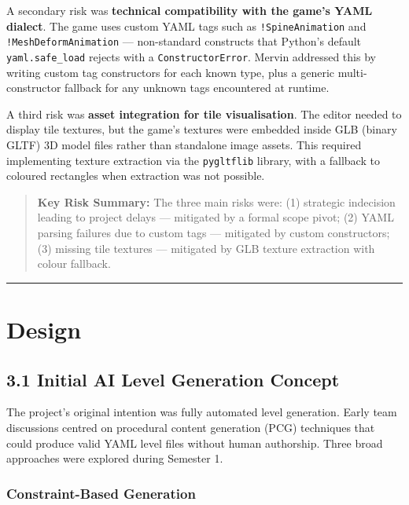 A secondary risk was \textbf{technical compatibility with the game's
YAML dialect}. The game uses custom YAML tags such as
\texttt{!SpineAnimation} and \texttt{!MeshDeformAnimation} ---
non-standard constructs that Python's default \texttt{yaml.safe\_load}
rejects with a \texttt{ConstructorError}. Mervin addressed this by
writing custom tag constructors for each known type, plus a generic
multi-constructor fallback for any unknown tags encountered at runtime.

A third risk was \textbf{asset integration for tile visualisation}. The
editor needed to display tile textures, but the game's textures were
embedded inside GLB (binary GLTF) 3D model files rather than standalone
image assets. This required implementing texture extraction via the
\texttt{pygltflib} library, with a fallback to coloured rectangles when
extraction was not possible.

\begin{quote}
\textbf{Key Risk Summary:} The three main risks were: (1) strategic
indecision leading to project delays --- mitigated by a formal scope
pivot; (2) YAML parsing failures due to custom tags --- mitigated by
custom constructors; (3) missing tile textures --- mitigated by GLB
texture extraction with colour fallback.
\end{quote}

\begin{center}\rule{0.5\linewidth}{0.5pt}\end{center}

\section{Design}\label{design}

\subsection{3.1 Initial AI Level Generation
Concept}\label{initial-ai-level-generation-concept}

The project's original intention was fully automated level generation.
Early team discussions centred on procedural content generation (PCG)
techniques that could produce valid YAML level files without human
authorship. Three broad approaches were explored during Semester 1.

\subsubsection{Constraint-Based
Generation}\label{constraint-based-generation}

